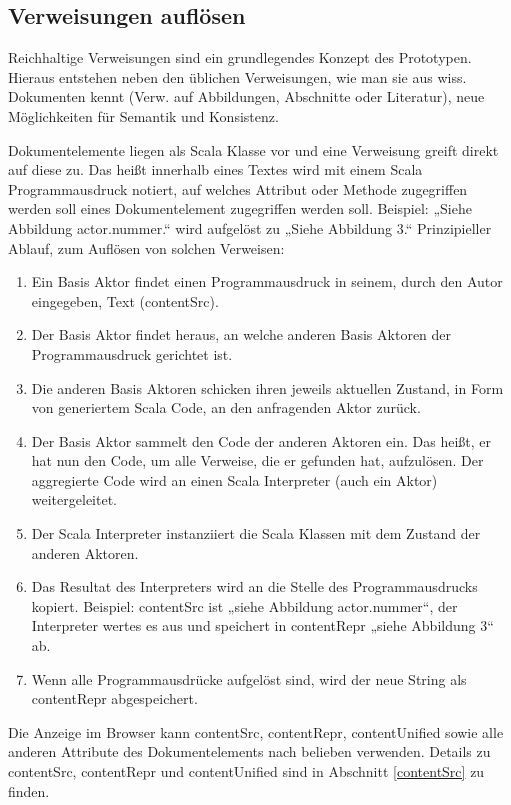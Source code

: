 \subsection{Verweisungen auflösen}\label{verweise-aufloesen}
 
Reichhaltige Verweisungen sind ein grundlegendes Konzept des Prototypen. Hieraus entstehen neben den üblichen Verweisungen, wie man sie aus wiss. Dokumenten kennt (Verw. auf Abbildungen, Abschnitte oder Literatur), neue Möglichkeiten für Semantik und Konsistenz.

 
Dokumentelemente liegen als Scala Klasse vor und eine Verweisung greift direkt auf diese zu. Das heißt innerhalb eines Textes wird mit einem Scala Programmausdruck notiert, auf welches Attribut oder Methode zugegriffen werden soll eines Dokumentelement zugegriffen werden soll. Beispiel: „Siehe Abbildung {actor.nummer}.“ wird aufgelöst zu „Siehe Abbildung 3.“ Prinzipieller Ablauf, zum Auflösen von solchen Verweisen:

 
\begin{enumerate}

\item Ein Basis Aktor findet einen Programmausdruck in seinem, durch den Autor eingegeben, Text (contentSrc).
\item Der Basis Aktor findet heraus, an welche anderen Basis Aktoren der Programmausdruck gerichtet ist.
\item Die anderen Basis Aktoren schicken ihren jeweils aktuellen Zustand, in Form von generiertem Scala Code, an den anfragenden Aktor zurück.
\item Der Basis Aktor sammelt den Code der anderen Aktoren ein. Das heißt, er hat nun den Code, um alle Verweise, die er gefunden hat, aufzulösen. Der aggregierte Code wird an einen Scala Interpreter (auch ein Aktor) weitergeleitet.
\item Der Scala Interpreter instanziiert die Scala Klassen mit dem Zustand der anderen Aktoren.
\item Das Resultat des Interpreters wird an die Stelle des Programmausdrucks kopiert. Beispiel: contentSrc ist „siehe Abbildung {actor.nummer}“, der Interpreter wertes es aus und speichert in contentRepr „siehe Abbildung 3“ ab.
\item Wenn alle Programmausdrücke aufgelöst sind, wird der neue String als contentRepr abgespeichert.
\end{enumerate}
 
Die Anzeige im Browser kann contentSrc, contentRepr, contentUnified sowie alle anderen Attribute des Dokumentelements nach belieben verwenden. Details zu contentSrc, contentRepr und contentUnified sind in Abschnitt \ref{contentSrc} zu finden.

